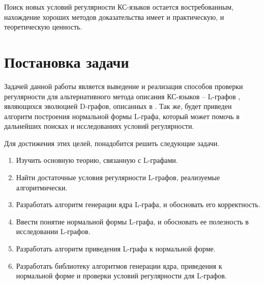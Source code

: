 Поиск новых условий регулярности КС-языков остается востребованным, нахождение
хороших методов доказательства имеет и практическую, и теоретическую ценность. 

\section{Постановка задачи}

Задачей данной работы является выведение и реализация способов проверки регулярности для альтернативного 
метода описания КС-языков -- L-графов \cite{vylitok_rostovski_o_podklassah,vylitok_sutirin_harakterizacia}, 
являющихся эволюцией D-графов, описанных в \cite{stan1}. Так же, будет приведен алгоритм построения нормальной формы
L-графа, который может помочь в дальнейших поисках и исследованиях условий регулярности.

Для достижения этих целей, понадобится решить следующие задачи.

\begin{enumerate}
    \item Изучить основную теорию, связанную с L-графами.
    \item Найти достаточные условия регулярности L-графов, реализуемые алгоритмически.
    \item Разработать алгоритм генерации ядра L-графа, и обосновать его корректность.
    \item Ввести понятие нормальной формы L-графа, и обосновать ее полезность в исследовании L-графов.
    \item Разработать алгоритм приведения L-графа к нормальной форме.
    \item Разработать библиотеку алгоритмов генерации ядра, приведения к нормальной форме и проверки условий регулярности для L-графов. 
\end{enumerate}

\clearpage
